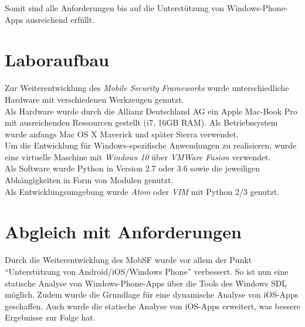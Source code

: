 Somit sind alle Anforderungen bis auf die Unterstützung von Windows-Phone-Apps ausreichend erfüllt.
	
\section{Laboraufbau}
Zur Weiterentwicklung des \textit{Mobile Security Frameworks} wurde unterschiedliche Hardware mit verschiedenen Werkzeugen genutzt.\\

Als Hardware wurde durch die Allianz Deutschland AG ein Apple Mac-Book Pro mit ausreichenden Ressourcen gestellt (i7, 16GB RAM). Als Betriebssystem wurde anfangs Mac OS X Maverick und später Sierra verwendet.\\

Um die Entwicklung für Windows-spezifische Anwendungen zu realisieren, wurde eine virtuelle Maschine mit \textit{Windows  10} über \textit{VMWare Fusion} verwendet.\\

Als Software wurde Python in Version 2.7 oder 3.6 sowie die jeweiligen Abhängigkeiten in Form von Modulen genutzt.\\

Als Entwicklungsumgebung wurde \textit{Atom} oder \textit{VIM} mit Python 2/3 genutzt.

	


		

  
\section{Abgleich mit Anforderungen}
Durch die Weiterentwicklung des MobSF wurde vor allem der Punkt "`Unterstützung von Android/iOS/Windows Phone"' verbessert. So ist nun eine statische Analyse von Windows-Phone-Apps über die Tools des Windows SDL möglich. Zudem wurde die Grundlage für eine dynamische Analyse von iOS-Apps geschaffen. Auch wurde die statische Analyse von iOS-Apps erweitert, was bessere Ergebnisse zur Folge hat.\\

